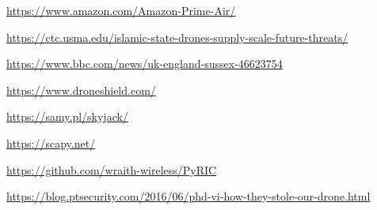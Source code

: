 \documentclass[conference,a4paper]{IEEEtran}
\begin{document}
\begin{thebibliography}{1}
    \url{https://www.amazon.com/Amazon-Prime-Air/}

    \url{https://ctc.usma.edu/islamic-state-drones-supply-scale-future-threats/}

    \url{https://www.bbc.com/news/uk-england-sussex-46623754}

    \url{https://www.droneshield.com/}

    \url{https://samy.pl/skyjack/}

    \url{https://scapy.net/}

    \url{https://github.com/wraith-wireless/PyRIC}

    \url{https://blog.ptsecurity.com/2016/06/phd-vi-how-they-stole-our-drone.html}

\end{thebibliography}
\end{document}
